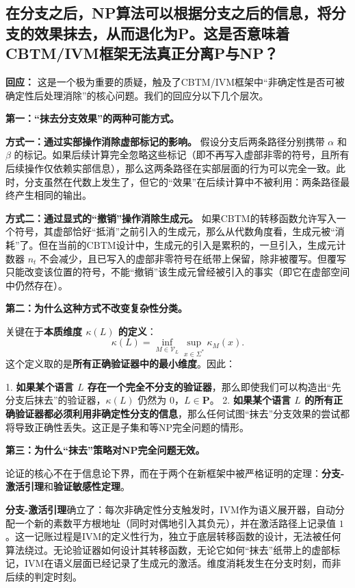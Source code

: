 \documentclass{ctexart}
\begin{document}
	
	
	\subsection{在分支之后，NP算法可以根据分支之后的信息，将分支的效果抹去，从而退化为P。这是否意味着CBTM/IVM框架无法真正分离P与NP？}
	
	\textbf{回应：} 这是一个极为重要的质疑，触及了CBTM/IVM框架中``非确定性是否可被确定性后处理消除''的核心问题。我们的回应分以下几个层次。
	
	\textbf{第一：``抹去分支效果''的两种可能方式。}
	
	\textbf{方式一：通过实部操作消除虚部标记的影响。} 假设分支后两条路径分别携带 $\alpha$ 和 $\beta$ 的标记。如果后续计算完全忽略这些标记（即不再写入虚部非零的符号，且所有后续操作仅依赖实部信息），那么这两条路径在实部层面的行为可以完全一致。此时，分支虽然在代数上发生了，但它的``效果''在后续计算中不被利用：两条路径最终产生相同的输出。
	
	\textbf{方式二：通过显式的``撤销''操作消除生成元。} 如果CBTM的转移函数允许写入一个符号，其虚部恰好``抵消''之前引入的生成元，那么从代数角度看，生成元被``消耗''了。但在当前的CBTM设计中，生成元的引入是累积的，一旦引入，生成元计数器 $n_t$ 不会减少，且已写入的虚部非零符号在纸带上保留，除非被覆写。但覆写只能改变该位置的符号，不能``撤销''该生成元曾经被引入的事实（即它在虚部空间中仍然存在）。
	
	\textbf{第二：为什么这种方式不改变复杂性分类。}
	
	关键在于\textbf{本质维度 $\kappa(L)$ 的定义}：
	\[
	\kappa(L) = \inf_{M \in \mathcal{V}_L} \sup_{x \in \Sigma^*} \kappa_M(x).
	\]
	这个定义取的是\textbf{所有正确验证器中的最小维度}。因此：
	
	1. \textbf{如果某个语言 $L$ 存在一个完全不分支的验证器}，那么即使我们可以构造出``先分支后抹去''的验证器，$\kappa(L)$ 仍然为 $0$，$L \in \mathbf{P}$。
	2. \textbf{如果某个语言 $L$ 的所有正确验证器都必须利用非确定性分支的信息}，那么任何试图``抹去''分支效果的尝试都将导致正确性丢失。这正是子集和等NP完全问题的情形。
	
	\textbf{第三：为什么``抹去''策略对NP完全问题无效。}
	
	论证的核心不在于信息论下界，而在于两个在新框架中被严格证明的定理：\textbf{分支-激活引理}和\textbf{验证敏感性定理}。
	
	\textbf{分支-激活引理}确立了：每次非确定性分支触发时，IVM作为语义展开器，自动分配一个新的素数平方根地址（同时对偶地引入其负元），并在激活路径上记录值 $1$。这一记账过程是IVM的定义性行为，独立于底层转移函数的设计，无法被任何算法绕过。无论验证器如何设计其转移函数，无论它如何``抹去''纸带上的虚部标记，IVM在语义层面已经记录了生成元的激活。维度消耗发生在分支时刻，而非后续的判定时刻。
	
\end{document}
